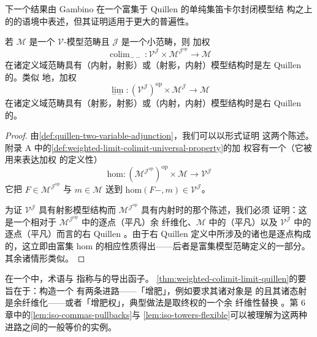 下一个结果由 Gambino \cite{bib45} 在一个富集于 Quillen 的单纯集笛卡尔封闭模型结
构之上的\trModelCategory{}的语境中表述，但其证明适用于更大的普遍性。

\begin{theorem}\label{thm:weighted-colimit-limit-quillen}
若 $\mathcal{M}$ 是一个 $\mathcal{V}$-模型范畴且 $\mathcal{J}$ 是一个小范畴，则
加权\trColimit{}\trFunctor
\[ \operatorname{colim}_{--}\colon
   \mathcal{V}^{\mathcal{J}}\times\mathcal{M}^{\mathcal{J}^{\mathrm{op}}}
   \to\mathcal{M} \]
在诸定义域范畴具有（内射，射影）或（射影，内射）模型结构时是左 Quillen 的。类似
地，加权\trLimit{}\trFunctor
\[ \operatorname{lim}_{--}\colon
   (\mathcal{V}^{\mathcal{J}})^{\mathrm{op}}\times\mathcal{M}^{\mathcal{J}}
   \to\mathcal{M} \]
在诸定义域范畴具有（射影，射影）或（内射，内射）模型结构时是右 Quillen 的。
\end{theorem}
\begin{proof}
由\cref{def:quillen-two-variable-adjunction}，我们可以以\trAdjunction{}形式证明
这两个陈述。附录 A 中的\cref{def:weighted-limit-colimit-universal-property}的加
权\trColimit{}\trBifunctor{}容有一个\trRightAdjoint（它被用来表达加权%
\trColimit{}的定义性\trUniversalProperty）
\[ \mathrm{hom}\colon
   (\mathcal{M}^{\mathcal{J}^{\mathrm{op}}})^{\mathrm{op}}\times\mathcal{M}
   \to\mathcal{V}^{\mathcal{J}} \]
它把 $F\in\mathcal{M}^{\mathcal{J}^{\mathrm{op}}}$ 与 $m\in\mathcal{M}$ 送到
$\mathrm{hom}(F-,m)\in\mathcal{V}^{\mathcal{J}}$。

为证 $\mathcal{V}^{\mathcal{J}}$ 具有射影模型结构而
$\mathcal{M}^{\mathcal{J}^{\mathrm{op}}}$ 具有内射\trModelStructure{}时的那个陈述，我们必须
证明：这是一个相对于 $\mathcal{M}^{\mathcal{J}^{\mathrm{op}}}$ 中的逐点（平凡）余
纤维化、$\mathcal{M}$ 中的（平凡）\trFibration{}以及 $\mathcal{V}^{\mathcal{J}}$
中的逐点（平凡）\trFibration{}而言的右 Quillen \trBifunctor。由于右 Quillen %
\trBifunctor{}定义中所涉及的诸\trLimit{}也是逐点构成的，这立即由富集 hom %
\trBifunctor{}的相应性质得出——后者是富集模型范畴定义的一部分。其余诸情形类似。
\end{proof}

\begin{digression}\label{dig:homotopy-colimit-construction}
在一个\trModelCategory{}中，术语\emph{\trHomotopyColimit}与\emph{\trHomotopyLimit}
指称\trColimit{}\trFunctor{}与\trLimit{}\trFunctor{}的导出函子。%
\cref{thm:weighted-colimit-limit-quillen}的要旨在于：构造一个%
\trHomotopyColimit{}有两条进路——「增肥\trDiagram」，例如要求其诸对象是%
\trCofibrant{}的且其诸态射是余纤维化——或者「增肥权」，典型做法是取终权的一个余
纤维性替换 \cite[§11.5]{bib103}。第 6 章中的\cref{lem:iso-commas-pullbacks}与%
\cref{lem:iso-towers-flexible}可以被理解为这两种进路之间的一般等价的实例。
\end{digression}

